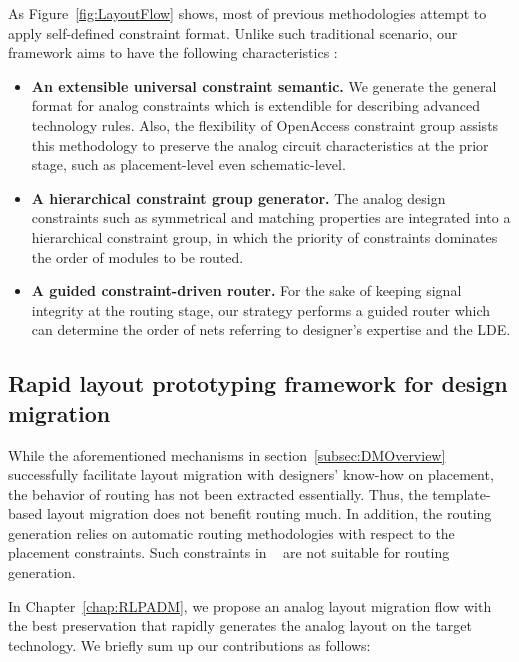       As Figure~\ref{fig:LayoutFlow} shows, most of previous methodologies attempt to apply self-defined constraint format. Unlike such traditional scenario, our framework aims to have the following characteristics :
      \begin{itemize}
        \item {\bf An extensible universal constraint semantic.} We generate the general format for analog constraints which is extendible for describing advanced technology rules. Also, the flexibility of OpenAccess constraint group assists this methodology to preserve the analog circuit characteristics at the prior stage, such as placement-level even schematic-level.
        \item {\bf A hierarchical constraint group generator.} The analog design constraints such as symmetrical and matching properties are integrated into a hierarchical constraint group, in which the priority of constraints dominates the order of modules to be routed.
        \item {\bf A guided constraint-driven router.} For the sake of keeping signal integrity at the routing stage, our strategy performs a guided router which can determine the order of nets referring to designer's expertise and the LDE.
      \end{itemize}

    \subsection{Rapid layout prototyping framework for design migration}
    \label{subsec:DMRContribute}

      While the aforementioned mechanisms in section~\ref{subsec:DMOverview} successfully facilitate layout migration with designers' know-how on placement, the behavior of routing has not been extracted essentially. Thus, the template-based layout migration does not benefit routing much. In addition, the routing generation relies on automatic routing methodologies with respect to the placement constraints. Such constraints in ~\cite{cbc-bhattacharya-dac04,Bhattacharya_ASPDAC04,msc-bhattacharya-tcad06,Zhang_TCAD08,Wang_ALRGP_TODAES2011} are not suitable for routing generation. 

      In Chapter~\ref{chap:RLPADM}, we propose an analog layout migration flow with the best preservation that rapidly generates the analog layout on the target technology. We briefly sum up our contributions as follows:

